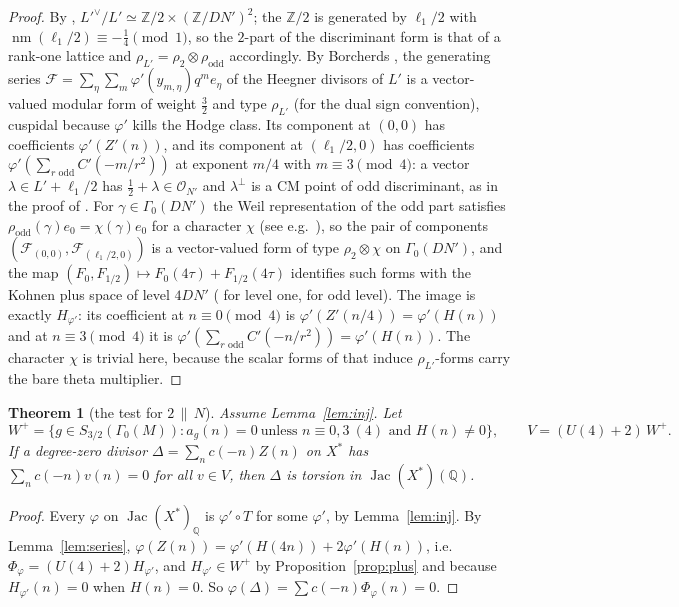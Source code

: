 \documentclass[11pt,reqno]{amsart}
\theoremstyle{plain}
\newtheorem{theorem}{Theorem}[section]
\theoremstyle{definition}
\DeclareMathOperator{\Jac}{Jac}
\DeclareMathOperator{\nm}{nm}
\newcommand{\Q}{\mathbb{Q}}
\newcommand{\Z}{\mathbb{Z}}
\newcommand{\cO}{\mathcal{O}}
\begin{document}
\begin{proof}
By \cite[Corollary 9]{gy}, $L'^\vee/L'\simeq\Z/2\times(\Z/DN')^2$; the $\Z/2$ is generated by
$\ell_1/2$ with $\nm(\ell_1/2)\equiv-\tfrac14\pmod1$, so the $2$-part of the discriminant form is
that of a rank-one lattice and $\rho_{L'}=\rho_2\otimes\rho_{\mathrm{odd}}$ accordingly. By
Borcherds \cite[Theorem 4.5]{borcherds}, the generating series
$\mathcal F=\sum_{\eta}\sum_{m}\varphi'(y_{m,\eta})q^me_\eta$ of the Heegner divisors of $L'$ is a
vector-valued modular form of weight $\tfrac32$ and type $\rho_{L'}$ (for the dual sign convention),
cuspidal because $\varphi'$ kills the Hodge class. Its component at $(0,0)$ has coefficients
$\varphi'(Z'(n))$, and its component at $(\ell_1/2,0)$ has coefficients $\varphi'(\sum_{r\text{ odd}}C'(-m/r^2))$
at exponent $m/4$ with $m\equiv3\pmod4$: a vector $\lambda\in L'+\ell_1/2$ has $\tfrac12+\lambda\in\cO_{N'}$
and $\lambda^\perp$ is a CM point of odd discriminant, as in the proof of \cite[Lemma 25]{gy}. For
$\gamma\in\Gamma_0(DN')$ the Weil representation of the odd part satisfies
$\rho_{\mathrm{odd}}(\gamma)e_0=\chi(\gamma)e_0$ for a character $\chi$ (see e.g.\ \cite[Theorem 4.7]{scheithauer}),
so the pair of components $(\mathcal F_{(0,0)},\mathcal F_{(\ell_1/2,0)})$ is a vector-valued form
of type $\rho_2\otimes\chi$ on $\Gamma_0(DN')$, and the map
$(F_0,F_{1/2})\mapsto F_0(4\tau)+F_{1/2}(4\tau)$ identifies such forms with the Kohnen plus space
of level $4DN'$ (\cite[\S5]{ez} for level one, \cite{kohnen} for odd level). The image is exactly $H_{\varphi'}$: its
coefficient at $n\equiv0\pmod4$ is $\varphi'(Z'(n/4))=\varphi'(H(n))$ and at $n\equiv3\pmod4$ it is
$\varphi'(\sum_{r\text{ odd}}C'(-n/r^2))=\varphi'(H(n))$. The character $\chi$ is trivial here,
because the scalar forms of \cite[Lemma 10]{gy} that induce $\rho_{L'}$-forms carry the bare theta
multiplier.
\end{proof}

\begin{theorem}[the test for $2\,\|\,N$]\label{thm:test}
Assume Lemma~\ref{lem:inj}. Let
\[
W^+=\{g\in S_{3/2}(\Gamma_0(M)):a_g(n)=0\ \text{unless }n\equiv0,3\ (4)\text{ and }H(n)\neq0\},\qquad
V=(U(4)+2)\,W^+ .
\]
If a degree-zero divisor $\Delta=\sum_nc(-n)Z(n)$ on $X^*$ has $\sum_nc(-n)v(n)=0$ for all $v\in V$,
then $\Delta$ is torsion in $\Jac(X^*)(\Q)$.
\end{theorem}

\begin{proof}
Every $\varphi$ on $\Jac(X^*)_\Q$ is $\varphi'\circ T$ for some $\varphi'$, by Lemma~\ref{lem:inj}.
By Lemma~\ref{lem:series}, $\varphi(Z(n))=\varphi'(H(4n))+2\varphi'(H(n))$, i.e.\
$\Phi_\varphi=(U(4)+2)H_{\varphi'}$, and $H_{\varphi'}\in W^+$ by Proposition~\ref{prop:plus} and
because $H_{\varphi'}(n)=0$ when $H(n)=0$. So $\varphi(\Delta)=\sum c(-n)\Phi_\varphi(n)=0$.
\end{proof}
\end{document}
